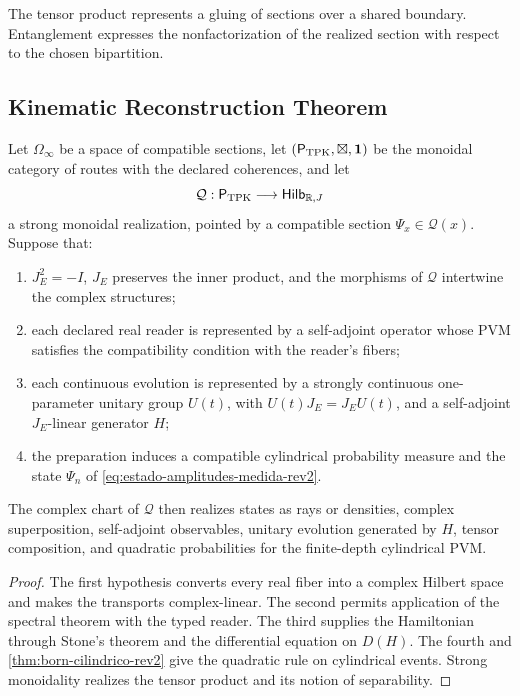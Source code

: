 \begin{principle}
The tensor product represents a gluing of sections over a shared
boundary. Entanglement expresses the nonfactorization of the
realized section with respect to the chosen bipartition.
\end{principle}

\subsection{Kinematic Reconstruction Theorem}

\begin{theorem}
\label{thm:cinematica-cuantica-tpk-rev2}
Let \(\Omega_\infty\) be a space of compatible sections, let
\((\mathsf P_{\rm TPK},\boxtimes,\mathbf 1)\) be the monoidal category of routes with the declared
coherences, and let
\[
 \mathcal Q:\mathsf P_{\rm TPK}\longrightarrow
 \mathsf{Hilb}_{\mathbb R,J}
\]
a strong monoidal realization, pointed by a compatible section
\(\Psi_x\in\mathcal Q(x)\). Suppose that:
\begin{enumerate}
 \item \(J_E^2=-I\), \(J_E\) preserves the inner product, and
the morphisms of \(\mathcal Q\) intertwine the complex structures;
 \item each declared real reader is represented by a self-adjoint operator
 whose PVM satisfies the compatibility condition with the reader's fibers;
 \item each continuous evolution is represented by a strongly continuous
 one-parameter unitary group \(U(t)\), with
 \(U(t)J_E=J_EU(t)\), and a self-adjoint \(J_E\)-linear generator \(H\);
 \item the preparation induces a compatible cylindrical probability measure
 and the state \(\Psi_n\) of \eqref{eq:estado-amplitudes-medida-rev2}.
\end{enumerate}
The complex chart of \(\mathcal Q\) then realizes states as rays or densities,
complex superposition, self-adjoint observables, unitary evolution generated
by \(H\), tensor composition, and quadratic probabilities for the
finite-depth cylindrical PVM.
\end{theorem}

\begin{proof}
The first hypothesis converts every real fiber into a complex Hilbert
space and makes the transports complex-linear. The second permits
application of the spectral theorem with the typed reader. The third supplies the
Hamiltonian through Stone's theorem and the differential equation on
\(D(H)\). The fourth and \cref{thm:born-cilindrico-rev2} give the quadratic
rule on cylindrical events. Strong monoidality realizes the
tensor product and its notion of separability.
\end{proof}

